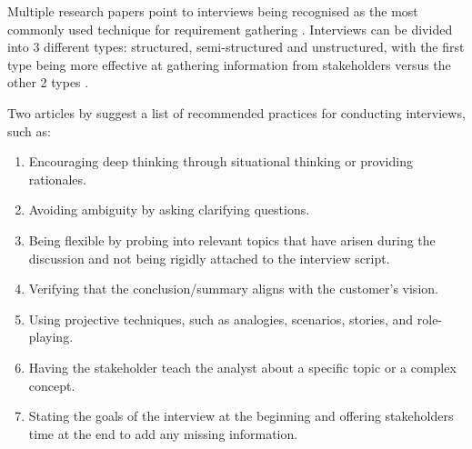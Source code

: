 Multiple research papers point to interviews being recognised as the most commonly used technique for requirement gathering \parencite{interviews5,interviews1,interviews2}. Interviews can be divided into 3 different types: structured, semi-structured and unstructured, with the first type being more effective at gathering information from stakeholders versus the other 2 types \parencite{interviews5,interviews6}. 

Two articles by \textcite{interviews4, interviews3} suggest a list of recommended practices for conducting interviews, such as:
\begin{enumerate}
    \item Encouraging deep thinking through situational thinking or providing rationales.
    \item Avoiding ambiguity by asking clarifying questions.
    \item Being flexible by probing into relevant topics that have arisen during the discussion and not being rigidly attached to the interview script.
    \item Verifying that the conclusion/summary aligns with the customer's vision.
    \item Using projective techniques, such as analogies, scenarios, stories, and role-playing.
    \item Having the stakeholder teach the analyst about a specific topic or a complex concept.
    \item Stating the goals of the interview at the beginning and offering stakeholders time at the end to add any missing information.
\end{enumerate}

